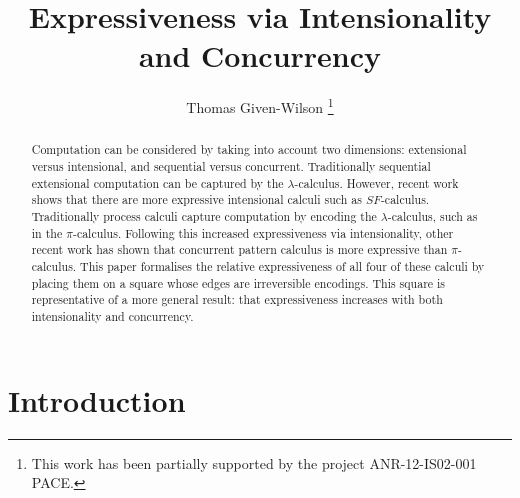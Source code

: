 \documentclass{llncs}
\title{Expressiveness via Intensionality and Concurrency}
\author{Thomas Given-Wilson
\thanks{This work has been partially supported by the project ANR-12-IS02-001 PACE.}}
\institute{INRIA, Paris, France\\
\email{thomas.given-wilson@inria.fr}}
\begin{document}
\makeatactive

\makeatletter
\def \rightarrowfill{\m@th\mathord{\smash-}\mkern-6mu\cleaders\hbox{$\mkern-2mu\mathord{\smash-}\mkern-2mu$}\hfill
  \mkern-6mu\mathord\to}
\makeatother
\makeatletter
\def \Rightarrowfill{\m@th\mathord{\smash=}\mkern-6mu\cleaders\hbox{$\mkern-2mu\mathord{\smash=}\mkern-2mu$}\hfill
  \mkern-6mu\mathord\Rightarrow}
\makeatother
\def \overstackrel#1#2{\mathrel{\mathop{#1}\limits^{#2}}}

\maketitle  

\vspace{-0.4cm}

\begin{abstract}
Computation can be considered by taking into account two dimensions:
extensional versus intensional,
and sequential versus concurrent.
Traditionally sequential extensional computation can be captured by
the $\lambda$-calculus. However, recent work shows that there are more
expressive intensional calculi such as $SF$-calculus.
Traditionally process calculi capture computation by encoding the 
$\lambda$-calculus, such as in the $\pi$-calculus.
Following this increased expressiveness via intensionality, other
recent work has shown that concurrent pattern calculus is more
expressive than $\pi$-calculus.
This paper formalises the relative expressiveness of all four of these
calculi by placing them on a square whose edges are irreversible
encodings.
This square is representative of a more general result:
that expressiveness increases with both intensionality and concurrency.
\end{abstract} 


\section{Introduction}
\label{sec:intro}

\vspace{-0.1cm}
\end{document}
